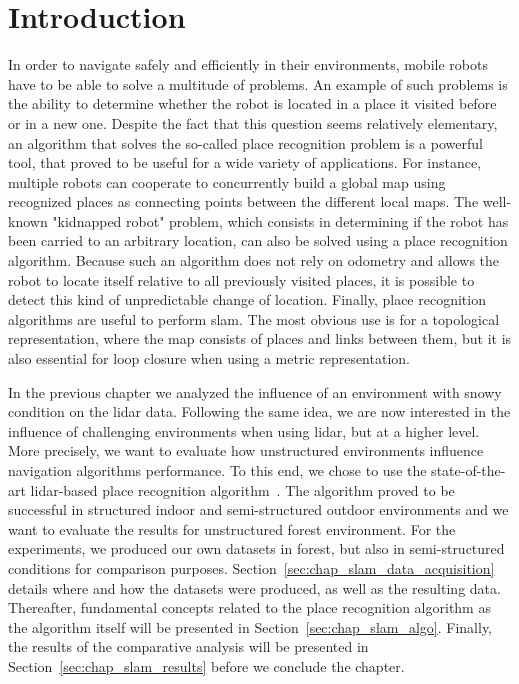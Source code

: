 \section{Introduction}
\label{sec:chap_slam_intro}

In order to navigate safely and efficiently in their environments, mobile robots have to be able to solve a multitude of problems. An example of such problems is the ability to determine whether the robot is located in a place it visited before or in a new one.  Despite the fact that this question seems relatively elementary, an algorithm that solves the so-called place recognition problem is a powerful tool, that proved to be useful for a wide variety of applications. For instance, multiple robots can cooperate to concurrently build a global map using recognized places as connecting points between the different local maps. The well-known "kidnapped robot" problem, which consists in determining if the robot has been carried to an arbitrary location, can also be solved using a place recognition algorithm. Because such an algorithm does not rely on odometry and allows the robot to locate itself relative to all previously visited places, it is possible to detect this kind of unpredictable change of location. Finally, place recognition algorithms are useful to perform \gls*{slam}. The most obvious use is for a topological representation, where the map consists of places and links between them, but it is also essential for loop closure when using a metric representation. 

In the previous chapter we analyzed the influence of an environment with snowy condition on the \gls*{lidar} data. Following the same idea, we are now interested in the influence of challenging environments when using \gls*{lidar}, but at a higher level. More precisely, we want to evaluate how unstructured environments influence navigation algorithms performance. To this end, we chose to use the state-of-the-art \gls*{lidar}-based place recognition algorithm~\citep{Steder2011b}. The algorithm proved to be successful in structured indoor and semi-structured outdoor environments and we want to evaluate the results for unstructured forest environment. For the experiments, we produced our own datasets in forest, but also in semi-structured conditions for comparison purposes. Section~\ref{sec:chap_slam_data_acquisition} details where and how the datasets were produced, as well as the resulting data. Thereafter, fundamental concepts related to the place recognition algorithm as the algorithm itself will be presented in Section~\ref{sec:chap_slam_algo}. Finally, the results of the comparative analysis will be presented in Section~\ref{sec:chap_slam_results} before we conclude the chapter.


